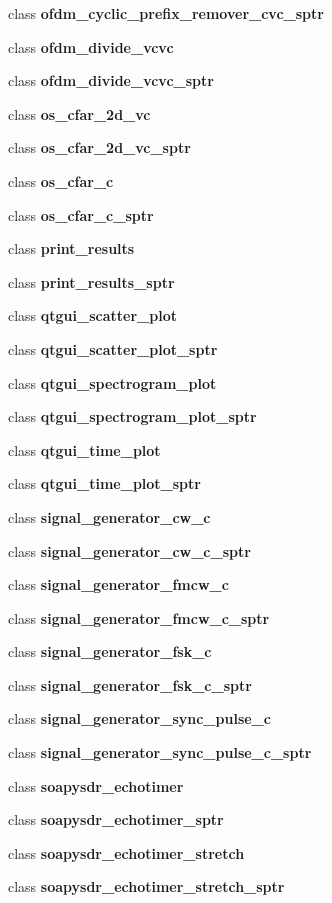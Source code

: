 \begin{DoxyCompactItemize}
\item 
class {\bf ofdm\+\_\+cyclic\+\_\+prefix\+\_\+remover\+\_\+cvc\+\_\+sptr}
\item 
class {\bf ofdm\+\_\+divide\+\_\+vcvc}
\item 
class {\bf ofdm\+\_\+divide\+\_\+vcvc\+\_\+sptr}
\item 
class {\bf os\+\_\+cfar\+\_\+2d\+\_\+vc}
\item 
class {\bf os\+\_\+cfar\+\_\+2d\+\_\+vc\+\_\+sptr}
\item 
class {\bf os\+\_\+cfar\+\_\+c}
\item 
class {\bf os\+\_\+cfar\+\_\+c\+\_\+sptr}
\item 
class {\bf print\+\_\+results}
\item 
class {\bf print\+\_\+results\+\_\+sptr}
\item 
class {\bf qtgui\+\_\+scatter\+\_\+plot}
\item 
class {\bf qtgui\+\_\+scatter\+\_\+plot\+\_\+sptr}
\item 
class {\bf qtgui\+\_\+spectrogram\+\_\+plot}
\item 
class {\bf qtgui\+\_\+spectrogram\+\_\+plot\+\_\+sptr}
\item 
class {\bf qtgui\+\_\+time\+\_\+plot}
\item 
class {\bf qtgui\+\_\+time\+\_\+plot\+\_\+sptr}
\item 
class {\bf signal\+\_\+generator\+\_\+cw\+\_\+c}
\item 
class {\bf signal\+\_\+generator\+\_\+cw\+\_\+c\+\_\+sptr}
\item 
class {\bf signal\+\_\+generator\+\_\+fmcw\+\_\+c}
\item 
class {\bf signal\+\_\+generator\+\_\+fmcw\+\_\+c\+\_\+sptr}
\item 
class {\bf signal\+\_\+generator\+\_\+fsk\+\_\+c}
\item 
class {\bf signal\+\_\+generator\+\_\+fsk\+\_\+c\+\_\+sptr}
\item 
class {\bf signal\+\_\+generator\+\_\+sync\+\_\+pulse\+\_\+c}
\item 
class {\bf signal\+\_\+generator\+\_\+sync\+\_\+pulse\+\_\+c\+\_\+sptr}
\item 
class {\bf soapysdr\+\_\+echotimer}
\item 
class {\bf soapysdr\+\_\+echotimer\+\_\+sptr}
\item 
class {\bf soapysdr\+\_\+echotimer\+\_\+stretch}
\item 
class {\bf soapysdr\+\_\+echotimer\+\_\+stretch\+\_\+sptr}

\end{DoxyCompactItemize}
